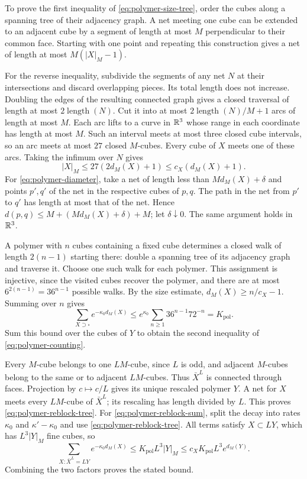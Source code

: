 To prove the first inequality of \eqref{eq:polymer-size-tree}, order
the cubes along a spanning tree of their adjacency graph. A net
meeting one cube can be extended to an adjacent cube by a segment of
length at most $M$ perpendicular to their common face. Starting with
one point and repeating this construction gives a net of length at
most $M(|X|_M-1)$.

For the reverse inequality, subdivide the segments of any net $N$ at
their intersections and discard overlapping pieces. Its total length
does not increase. Doubling the edges of the resulting connected
graph gives a closed traversal of length at most
$2\operatorname{length}(N)$. Cut it into at most
$2\operatorname{length}(N)/M+1$ arcs of length at most $M$.
Each arc lifts to a curve in $\mathbb R^3$ whose range in each coordinate
has length at most $M$. Such an interval meets at most three closed
cube intervals, so an arc meets at most $27$ closed $M$-cubes.
Every cube of $X$ meets one of these arcs. Taking the infimum over
$N$ gives
\[
 |X|_M\le27(2d_M(X)+1)\le c_X(d_M(X)+1).
\]
For \eqref{eq:polymer-diameter}, take a net of length less than
$Md_M(X)+\delta$ and points $p',q'$ of the net in the respective
cubes of $p,q$. The path in the net from $p'$ to $q'$ has length
at most that of the net. Hence
$d(p,q)\le M+(Md_M(X)+\delta)+M$; let $\delta\downarrow0$.
The same argument holds in $\mathbb R^3$.

A polymer with $n$ cubes containing a fixed cube determines a closed
walk of length $2(n-1)$ starting there: double a spanning tree of its
adjacency graph and traverse it. Choose one such walk for each
polymer. This assignment is injective, since the visited cubes recover
the polymer, and there are at most $6^{2(n-1)}=36^{n-1}$ possible
walks. By the size estimate, $d_M(X)\ge n/c_X-1$. Summing over $n$
gives
\[
 \sum_{X\supset\square}e^{-\kappa_0d_M(X)}
       \le e^{\kappa_0}\sum_{n\ge1}36^{n-1}72^{-n}=K_{\mathrm{pol}}.
\]
Sum this bound over the cubes of $Y$ to obtain the second inequality
of \eqref{eq:polymer-counting}.

Every $M$-cube belongs to one $LM$-cube, since $L$ is odd, and adjacent
$M$-cubes belong to the same or to adjacent $LM$-cubes. Thus $\bar X^L$
is connected through faces. Projection by $c\mapsto c/L$ gives its
unique rescaled polymer $Y$. A net for $X$ meets every $LM$-cube of
$\bar X^L$; its rescaling has length divided by $L$. This proves
\eqref{eq:polymer-reblock-tree}. For \eqref{eq:polymer-reblock-sum},
split the decay into rates $\kappa_0$ and $\kappa'-\kappa_0$ and use
\eqref{eq:polymer-reblock-tree}. All terms satisfy $X\subset LY$,
which has $L^3|Y|_M$ fine cubes, so
\[
 \sum_{X:\bar X^L=LY}e^{-\kappa_0d_M(X)}
      \le K_{\mathrm{pol}}L^3|Y|_M\le c_XK_{\mathrm{pol}}L^3e^{d_M(Y)}.
\]
Combining the two factors proves the stated bound.

